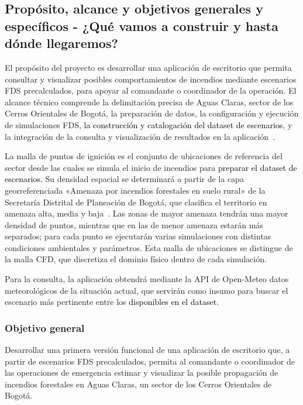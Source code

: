 \subsection{Propósito, alcance y objetivos generales y específicos - ¿Qué vamos a construir y hasta dónde llegaremos?}\label{sec:spmp-6-2}
El propósito del proyecto es desarrollar una aplicación de escritorio que permita consultar y visualizar posibles comportamientos de incendios mediante escenarios FDS precalculados, para apoyar al comandante o coordinador de la operación. El alcance técnico comprende la delimitación precisa de Aguas Claras, sector de los Cerros Orientales de Bogotá, la preparación de datos, la configuración y ejecución de simulaciones FDS, \textcolor{black}{la construcción y catalogación del dataset de escenarios}, y la integración de la consulta y visualización de resultados en la aplicación~\cite{vfp2026}.

La malla de puntos de ignición es el conjunto de ubicaciones de referencia del sector desde las cuales se simula el inicio de incendios para \textcolor{black}{preparar el dataset de escenarios}. Su densidad espacial se determinará a partir de la capa georreferenciada «Amenaza por incendios forestales en suelo rural» de la Secretaría Distrital de Planeación de Bogotá, que clasifica el territorio en amenaza alta, media y baja~\cite{sdppotamenaza40}. Las zonas de mayor amenaza tendrán una mayor densidad de puntos, mientras que en las de menor amenaza estarán más separados; para cada punto se ejecutarán varias simulaciones con distintas condiciones ambientales y parámetros. Esta malla de ubicaciones se distingue de la malla CFD, que discretiza el dominio físico dentro de cada simulación.

Para la consulta, la aplicación obtendrá mediante la API de Open-Meteo datos meteorológicos de la situación actual, que servirán como insumo para buscar el escenario más pertinente entre los \textcolor{black}{disponibles en el dataset}.


\subsubsection{Objetivo general}
Desarrollar una primera versión funcional de una aplicación de escritorio que, a partir de escenarios FDS precalculados, permita al comandante o coordinador de las operaciones de emergencia estimar y visualizar la posible propagación de incendios forestales en Aguas Claras, un sector de los Cerros Orientales de Bogotá.

